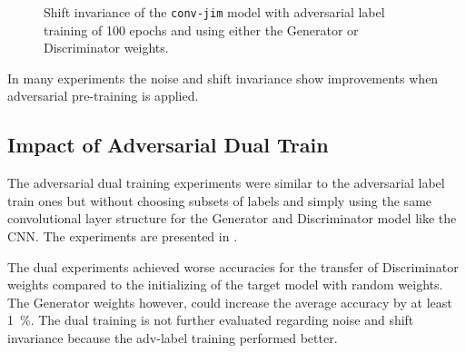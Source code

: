 \FloatBarrier
\noindent
\begin{figure}[!ht]
  \centering
  \quad
  \caption{Shift invariance of the \texttt{conv-jim} model with adversarial label training of 100 epochs and using either the Generator or Discriminator weights.}
  \label{fig:exp_adv_label_tb_shift_conv-jim}
\end{figure}
\FloatBarrier
\noindent
In many experiments the noise and shift invariance show improvements when adversarial pre-training is applied. 



\subsection{Impact of Adversarial Dual Train}
The adversarial dual training experiments were similar to the adversarial label train ones but without choosing subsets of labels and simply using the same convolutional layer structure for the Generator and Discriminator model like the CNN.
The experiments are presented in .

The dual experiments achieved worse accuracies for the transfer of Discriminator weights compared to the initializing of the target model with random weights.
The Generator weights however, could increase the average accuracy by at least \SI{1}{\percent}.
The dual training is not further evaluated regarding noise and shift invariance because the adv-label training performed better.